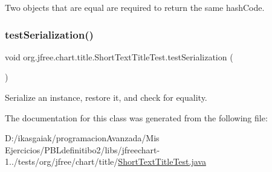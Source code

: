 Two objects that are equal are required to return the same hash\+Code. \mbox{\label{classorg_1_1jfree_1_1chart_1_1title_1_1_short_text_title_test_aa006cabfe0c5e41a12bc034a67b2c2ca}} 
\subsubsection{\texorpdfstring{test\+Serialization()}{testSerialization()}}
{\footnotesize\ttfamily void org.\+jfree.\+chart.\+title.\+Short\+Text\+Title\+Test.\+test\+Serialization (\begin{DoxyParamCaption}{ }\end{DoxyParamCaption})}

Serialize an instance, restore it, and check for equality. 

The documentation for this class was generated from the following file\+:\begin{DoxyCompactItemize}
\item 
D\+:/ikasgaiak/programacion\+Avanzada/\+Mis Ejercicios/\+P\+B\+Ldefinitibo2/libs/jfreechart-\/1../tests/org/jfree/chart/title/\mbox{\hyperlink{_short_text_title_test_8java}{Short\+Text\+Title\+Test.\+java}}\end{DoxyCompactItemize}
